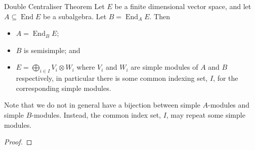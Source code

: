 \documentclass[fleqn]{NotesClass}
\DeclareMathOperator{\End}{End}
\DeclareMathOperator{\Hom}{Hom}
\newcommand{\action}{\mathbin{.}}
\newcommand{\isomorphic}{\cong}
\begin{document}
    \begin{thm}{Double Centraliser Theorem}{}
        Let \(E\) be a finite dimensional vector space, and let \(A \subseteq \End E\) be a subalgebra.
        Let \(B = \End_A E\).
        Then
        \begin{itemize}
            \item \(A = \End_B E\);
            \item \(B\) is semisimple; and
            \item \(E = \bigoplus_{i \in I} V_i \otimes W_i\) where \(V_i\) and \(W_i\) are simple modules of \(A\) and \(B\) respectively, in particular there is some common indexing set, \(I\), for the corresponding simple modules.
        \end{itemize}
        \begin{rmk}
            Note that we do not in general have a bijection between simple \(A\)-modules and simple \(B\)-modules.
            Instead, the common index set, \(I\), may repeat some simple modules.
        \end{rmk}
        \begin{proof}
%            
%            

\end{proof}
\end{thm}
\end{document}
